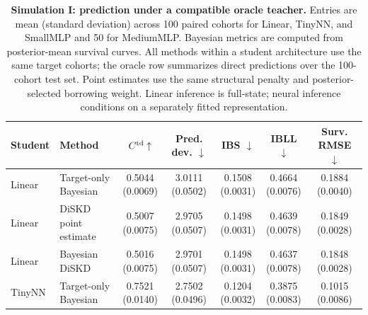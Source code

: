 \documentclass{article} %
\begin{document}
\begin{table}[!htbp]
\centering
\caption{\textbf{Simulation I: prediction under a compatible oracle teacher.} Entries are mean (standard deviation) across 100 paired cohorts for Linear, TinyNN, and SmallMLP and 50 for MediumMLP. Bayesian metrics are computed from posterior-mean survival curves. All methods within a student architecture use the same target cohorts; the oracle row summarizes direct predictions over the 100-cohort test set. Point estimates use the same structural penalty and posterior-selected borrowing weight. Linear inference is full-state; neural inference conditions on a separately fitted representation.}
\label{tab:sim1_architecture}\label{tab:sim1_architecture_full}
\footnotesize
\setlength{\tabcolsep}{4pt}
\begin{tabular}{llccccc}
\toprule
Student & Method & $C^{\rm td}\uparrow$ & Pred. dev. $\downarrow$ & IBS $\downarrow$ & IBLL $\downarrow$ & Surv. RMSE $\downarrow$ \\
\midrule
Linear & Target-only Bayesian & \shortstack{0.5044\\(0.0069)} & \shortstack{3.0111\\(0.0502)} & \shortstack{0.1508\\(0.0031)} & \shortstack{0.4664\\(0.0076)} & \shortstack{0.1884\\(0.0040)} \\
Linear & DiSKD point estimate & \shortstack{0.5007\\(0.0075)} & \shortstack{2.9705\\(0.0507)} & \shortstack{0.1498\\(0.0031)} & \shortstack{0.4639\\(0.0078)} & \shortstack{0.1849\\(0.0028)} \\
Linear & Bayesian DiSKD & \shortstack{0.5016\\(0.0075)} & \shortstack{2.9701\\(0.0507)} & \shortstack{0.1498\\(0.0031)} & \shortstack{0.4637\\(0.0078)} & \shortstack{0.1848\\(0.0028)} \\
\addlinespace
TinyNN & Target-only Bayesian & \shortstack{0.7521\\(0.0140)} & \shortstack{2.7502\\(0.0496)} & \shortstack{0.1204\\(0.0032)} & \shortstack{0.3875\\(0.0083)} & \shortstack{0.1015\\(0.0086)} \\

\end{tabular}
\end{table}
\end{document}
